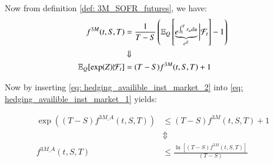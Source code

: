 Now from definition \ref{def: 3M_SOFR_futures}, we have: 
\begin{align}
\label{eq: hedging_availible_inst_market_2}
f^{3M}(t,S,T) &= \frac{1}{T-S}\left(
\mathbb{E}_{Q}\left[
\underbrace{e^{\int_{S}^{T}r_{u}du}}_{e^{Z}}
\bigg{|}\mathcal{F}_{t}\right] - 1
\right) \nonumber \\ 
&\Downarrow \nonumber \\ 
\mathbb{E}_{Q}[\exp(Z)|\mathcal{F}_{t}] &= (T-S)f^{3M}(t,S,T) + 1
\end{align}

Now by inserting \ref{eq: hedging_availible_inst_market_2} into \ref{eq: hedging_availible_inst_market_1} yields:

\begin{align*}
\exp\left(
(T-S)f^{3M\_A}(t,S,T)
\right) 
&\leq 
(T-S)f^{3M}(t,S,T) + 1 \\ 
&\Updownarrow \\
f^{3M\_A}(t,S,T) &\leq 
\frac{
\ln[(T-S)f^{3M}(t,S,T)]
}{
(T-S)
}
\end{align*}